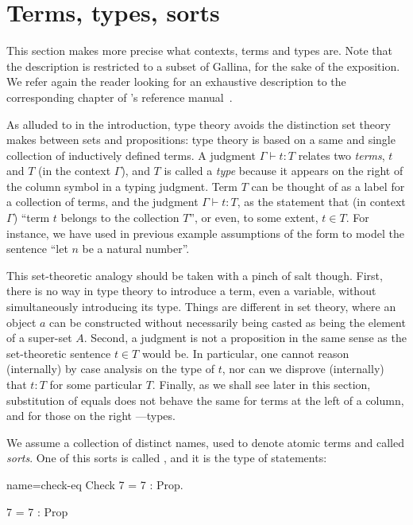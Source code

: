 \section{Terms, types, sorts}\label{sec:terms}

This section makes more precise what contexts, terms and types
are. Note that the description is restricted to a subset of Gallina,
for the sake of the exposition. We refer again the reader looking for
an exhaustive description to the corresponding chapter of \Coq{}'s
reference manual~\cite{Coq:manual}.

As alluded to in the introduction, type theory avoids the distinction
set theory makes between sets and propositions: type theory is based
on a same and single collection of inductively defined terms. A
judgment $\Gamma \vdash t : T$ relates two \emph{terms}, $t$ and $T$ (in the
context $\Gamma$), and $T$ is called a \emph{type} because it appears
on the right of the column symbol in a typing judgment. Term $T$ can be
thought of as a label for a collection of terms, and the judgment
$\Gamma \vdash t : T$, as the statement that (in context $\Gamma$)
``term $t$ belongs to the collection $T$'', or even, to some extent,
$t\in T$. 
For instance, we have used in previous example assumptions of the
form  to model the sentence ``let $n$ be a natural number''.

This set-theoretic analogy should be taken with a pinch of salt
though. First, there is no way in type theory to introduce a term, even
a variable, without simultaneously introducing its type. Things are
different in set theory, where an object $a$ can be constructed without
necessarily being casted as being the element of a super-set
$A$. Second, a judgment is not a proposition in the same sense as the
set-theoretic sentence $t \in T$ would be. In particular, one cannot
reason (internally) by case analysis on the type of
$t$, nor can we disprove (internally) that $t : T$ for some particular
$T$. Finally, as we shall see later in this section, substitution of
equals does not behave the same for terms at the left of a column, and
for those on the right ---types.


We assume a collection of distinct names, used to denote atomic terms
and called \emph{sorts}.  One of this sorts is called , and it
is the type of statements:

\begin{coq-left}{name=check-eq}{}
Check 7 = 7 : Prop.
\end{coq-left}
\begin{coqout-right}
7 = 7 : Prop
\end{coqout-right}

